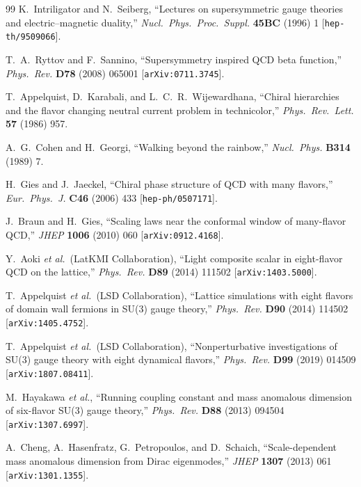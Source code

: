 \documentclass[11pt,a4paper]{article}
\theoremstyle{plain}
\theoremstyle{definition}
\theoremstyle{remark}
\begin{document}
\begin{thebibliography}{99}
  K.~Intriligator and N.~Seiberg,
  ``Lectures on supersymmetric gauge theories and electric--magnetic
  duality,''
  \textit{Nucl.~Phys.~Proc.~Suppl.} \textbf{45BC} (1996) 1
  [\texttt{hep-th/9509066}].

  T.~A.~Ryttov and F.~Sannino,
  ``Supersymmetry inspired QCD beta function,''
  \textit{Phys.~Rev.} \textbf{D78} (2008) 065001
  [\texttt{arXiv:0711.3745}].

  T.~Appelquist, D.~Karabali, and L.~C.~R.~Wijewardhana,
  ``Chiral hierarchies and the flavor changing neutral current problem
  in technicolor,''
  \textit{Phys.~Rev.~Lett.} \textbf{57} (1986) 957.

  A.~G.~Cohen and H.~Georgi,
  ``Walking beyond the rainbow,''
  \textit{Nucl.~Phys.} \textbf{B314} (1989) 7.

  H.~Gies and J.~Jaeckel,
  ``Chiral phase structure of QCD with many flavors,''
  \textit{Eur.~Phys.~J.} \textbf{C46} (2006) 433
  [\texttt{hep-ph/0507171}].

  J.~Braun and H.~Gies,
  ``Scaling laws near the conformal window of many-flavor QCD,''
  \textit{JHEP} \textbf{1006} (2010) 060
  [\texttt{arXiv:0912.4168}].

  Y.~Aoki \textit{et al.}\ (LatKMI Collaboration),
  ``Light composite scalar in eight-flavor QCD on the lattice,''
  \textit{Phys.~Rev.} \textbf{D89} (2014) 111502
  [\texttt{arXiv:1403.5000}].

  T.~Appelquist \textit{et al.}\ (LSD Collaboration),
  ``Lattice simulations with eight flavors of domain wall fermions
  in SU(3) gauge theory,''
  \textit{Phys.~Rev.} \textbf{D90} (2014) 114502
  [\texttt{arXiv:1405.4752}].

  T.~Appelquist \textit{et al.}\ (LSD Collaboration),
  ``Nonperturbative investigations of SU(3) gauge theory with eight
  dynamical flavors,''
  \textit{Phys.~Rev.} \textbf{D99} (2019) 014509
  [\texttt{arXiv:1807.08411}].

  M.~Hayakawa \textit{et al.},
  ``Running coupling constant and mass anomalous dimension of
  six-flavor SU(3) gauge theory,''
  \textit{Phys.~Rev.} \textbf{D88} (2013) 094504
  [\texttt{arXiv:1307.6997}].

  A.~Cheng, A.~Hasenfratz, G.~Petropoulos, and D.~Schaich,
  ``Scale-dependent mass anomalous dimension from Dirac eigenmodes,''
  \textit{JHEP} \textbf{1307} (2013) 061
  [\texttt{arXiv:1301.1355}].


\end{thebibliography}
\end{document}
